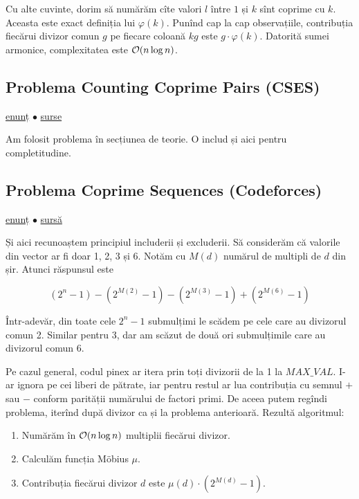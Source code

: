 \documentclass[../main.tex]{subfiles}
\begin{document}
Cu alte cuvinte, dorim să numărăm cîte valori $l$ între $1$ și $k$ sînt coprime cu $k$. Aceasta este exact definiția lui $\varphi(k)$. Punînd cap la cap observațiile, contribuția fiecărui divizor comun $g$ pe fiecare coloană $kg$ este $g \cdot \varphi(k)$. Datorită sumei armonice, complexitatea este $\mathcal{O}(n \log n)$.


\subsection{Problema Counting Coprime Pairs (CSES)}
\label{problem:counting-coprime-pairs}

\href{https://cses.fi/problemset/task/2417/}{enunț}
$\bullet$
\hyperref[code:exponentiation]{surse}

Am folosit problema în secțiunea de teorie. O includ și aici pentru completitudine.


\subsection{Problema Coprime Sequences (Codeforces)}
\label{problem:coprime-sequences}

\href{https://codeforces.com/contest/803/problem/F}{enunț}
$\bullet$
\hyperref[code:coprime-sequences]{sursă}

Și aici recunoaștem principiul includerii și excluderii. Să considerăm că valorile din vector ar fi doar 1, 2, 3 și 6. Notăm cu $M(d)$ numărul de multipli de $d$ din șir. Atunci răspunsul este

$$(2^{n} - 1) - (2^{M(2)} - 1) - (2^{M(3)} - 1) + (2^{M(6)} - 1)$$

Într-adevăr, din toate cele $2^n - 1$ submulțimi le scădem pe cele care au divizorul comun 2. Similar pentru 3, dar am scăzut de două ori submulțimile care au divizorul comun 6.

Pe cazul general, codul pinex ar itera prin toți divizorii de la 1 la $MAX\_VAL$. I-ar ignora pe cei liberi de pătrate, iar pentru restul ar lua contribuția cu semnul $+$ sau $-$ conform parității numărului de factori primi. De aceea putem regîndi problema, iterînd după divizor ca și la problema anterioară. Rezultă algoritmul:

\begin{enumerate}
  \item Numărăm în $\mathcal{O}(n \log n)$ multiplii fiecărui divizor.

  \item Calculăm funcția Möbius $\mu$.

  \item Contribuția fiecărui divizor $d$ este $\mu(d) \cdot (2^{M(d)} - 1)$.
\end{enumerate}
\end{document}
